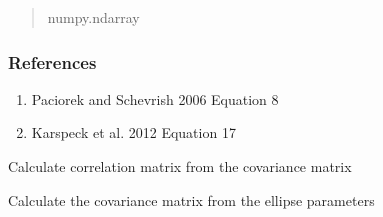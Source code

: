 \documentclass[letterpaper,10pt,english]{sphinxmanual}
\begin{document}
\begin{fulllineitems}
\begin{fulllineitems}
\begin{quote}
\begin{description}
\sphinxAtStartPar
numpy.ndarray

\end{description}\end{quote}
\subsubsection*{References}
\begin{enumerate}
%
\item {}
\sphinxAtStartPar
Paciorek and Schevrish 2006  Equation 8

\item {}
\sphinxAtStartPar
Karspeck et al. 2012  Equation 17

\end{enumerate}

\end{fulllineitems}


\begin{fulllineitems}
\label{\detokenize{ellipse:glomar_gridding.ellipse.EllipseCovarianceBuilder.calculate_cor}}
\pysigstartsignatures
\pysiglinewithargsret
{}
{}
{}
\pysigstopsignatures
\sphinxAtStartPar
Calculate correlation matrix from the covariance matrix
\begin{quote}\begin{description}
\sphinxAtStartPar
{}

\end{description}\end{quote}

\end{fulllineitems}


\begin{fulllineitems}
\label{\detokenize{ellipse:glomar_gridding.ellipse.EllipseCovarianceBuilder.calculate_covariance_array}}
\pysigstartsignatures
\pysiglinewithargsret
{}
{}
{}
\pysigstopsignatures
\sphinxAtStartPar
Calculate the covariance matrix from the ellipse parameters
\begin{quote}\begin{description}
\sphinxAtStartPar
{}


\end{description}
\end{quote}
\end{fulllineitems}
\end{fulllineitems}
\end{document}
